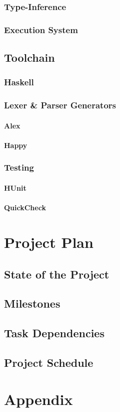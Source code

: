 \documentclass{article}
\begin{document}
\subsubsection{Type-Inference}
\subsubsection{Execution System} %
\subsection{Toolchain}
\subsubsection{Haskell} %
\subsubsection{Lexer \& Parser Generators}
\paragraph{Alex \\}
\paragraph{Happy \\}
\subsubsection{Testing}
\paragraph{HUnit \\}
\paragraph{QuickCheck \\}

\section{Project Plan}
\subsection{State of the Project} %
\subsection{Milestones}
\subsection{Task Dependencies}
\subsection{Project Schedule} %

\section{Appendix}
\end{document}
